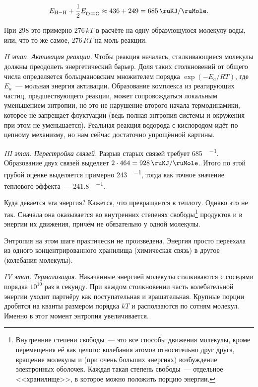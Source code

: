 \begin{equation*}
    E_{\ce{H\bond{1}H}} + \frac{1}{2} E_{\ce{O\bond{2}O}} \approx \num{436} + \num{249} = \qty{685}{\ruKJ\per\ruMole}.
\end{equation*}

При \qty{298}{\ruK} это примерно $276\,kT$ в расчёте на одну образующуюся молекулу воды, или, что то же самое, $276\,RT$ на моль реакции.

\textit{II этап. Активация реакции.} Чтобы реакция началась, сталкивающиеся молекулы должны преодолеть энергетический барьер. Доля таких столкновений от общего числа определяется больцмановским множителем порядка $\exp(-E_a/RT)$, где $E_a$~--- мольная энергия активации. Образование комплекса из реагирующих частиц, предшествующего реакции, может сопровождаться локальным уменьшением энтропии, но это не нарушение второго начала термодинамики, которое не запрещает флуктуации (ведь полная энтропия системы и окружения при этом не уменьшается). Реальная реакция водорода с кислородом идёт по цепному механизму, но нам сейчас достаточно упрощённой картины.

\textit{III этап. Перестройка связей.} Разрыв старых связей требует \qty{685}{\ruKJ\per\ruMole}. Образование двух связей  выделяет $2 \cdot \num{464} = \qty{928}{\ruKJ\per\ruMole}$. Итого по этой грубой оценке выделяется примерно \qty{243}{\ruKJ\per\ruMole}, тогда как точное значение теплового эффекта~--- \qty{241,8}{\ruKJ\per\ruMole}.

Куда девается эта энергия? Кажется, что превращается в теплоту. Однако это не так. Сначала она оказывается во внутренних степенях свободы\footnote{Внутренние степени свободы~--- это все способы движения молекулы, кроме перемещения её как целого: колебания
атомов относительно друг друга, вращение молекулы и (при очень больших энергиях) возбуждение электронных оболочек. Каждая такая степень свободы~--- отдельное <<хранилище>>, в которое можно положить порцию энергии.} продуктов и в энергии их движения, причём не обязательно у одной молекулы.

Энтропия на этом шаге практически не произведена. Энергия просто переехала из одного концентрированного хранилища (химическая связь) в другое (колебания молекулы).

\textit{IV этап. Термализация.} Накачанные энергией молекулы  сталкиваются с соседями порядка $10^{10}$ раз в секунду. При каждом столкновении часть колебательной энергии уходит партнёру как поступательная и вращательная. Крупные порции дробятся на кванты размером порядка $kT$ и расползаются по сотням молекул. Именно в этот момент энтропия увеличивается.

